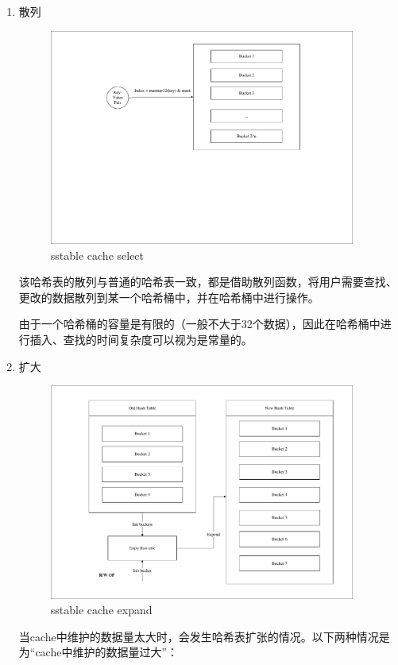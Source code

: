 \begin{enumerate}
			\begin{enumerate}
				\item 散列 
				
				\begin{figure}[H]
					\centering
					\includegraphics[width=0.95\textwidth]{pdf/cache_select.pdf}
					\caption{sstable cache select}
					\label{sstable_cache_select}
				\end{figure}
				该哈希表的散列与普通的哈希表一致，都是借助散列函数，将用户需要查找、更改的数据散列到某一个哈希桶中，并在哈希桶中进行操作。

由于一个哈希桶的容量是有限的（一般不大于32个数据），因此在哈希桶中进行插入、查找的时间复杂度可以视为是常量的。

				
				\item 扩大
				
				\begin{figure}[H]
					\centering
					\includegraphics[width=0.95\textwidth]{pdf/cache_expend.pdf}
					\caption{sstable cache expand}
					\label{sstable_cache_expand}
				\end{figure}
				当cache中维护的数据量太大时，会发生哈希表扩张的情况。以下两种情况是为“cache中维护的数据量过大”：


\end{enumerate}
\end{enumerate}
